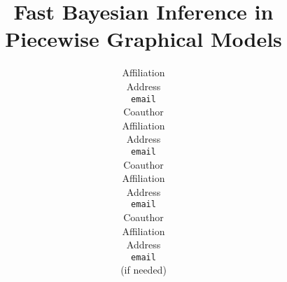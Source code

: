 \documentclass{article} %
\title{
Fast Bayesian Inference in\\ Piecewise Graphical Models
}
\author{
Affiliation \\
Address \\
\texttt{email} \\
\AND
Coauthor \\
Affiliation \\
Address \\
\texttt{email} \\
\And
Coauthor \\
Affiliation \\
Address \\
\texttt{email} \\
\And
Coauthor \\
Affiliation \\
Address \\
\texttt{email} \\
(if needed)\\
}
\begin{document}
\maketitle

\begin{abstract}

\end{abstract}
















\small{
}
\end{document}
